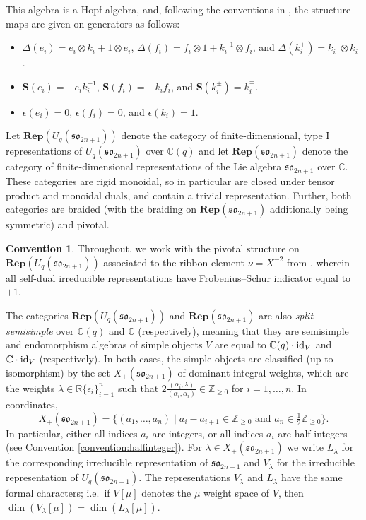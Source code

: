 \documentclass[10pt]{amsart}
\numberwithin{equation}{section}
\theoremstyle{definition}
\newtheorem{conv}[thm]{Convention}
\newcommand{\id}{{\rm id}}
\def\C{{\mathbb C}}
\def\R{{\mathbb R}}
\def\N{\mathbb{Z}_{\ge 0}}%
\newcommand{\son}[1][2n+1]{\mathfrak{so}_{#1}}
\newcommand{\Rep}{\mathbf{Rep}}
\begin{document}
This algebra is a Hopf algebra, and, 
following the conventions in \cite{CP,ST},
the structure maps are given on generators as follows:
\begin{itemize}
\item $\Delta(e_i) = e_i \otimes k_i + 1\otimes e_i$, 
	$\Delta(f_i) = f_i\otimes 1 + k_i^{-1}\otimes f_i$, 
	and $\Delta(k_i^{\pm}) = k_i ^{\pm}\otimes k_i^{\pm}$.
\item $\mathbf{S}(e_i) = -e_i k_i^{-1}$, 
	$\mathbf{S}(f_i) = - k_i f_i$, 
	and $\mathbf{S}(k_i^{\pm})= k_i^{\mp}$.
\item $\epsilon(e_i)= 0$, 
	$\epsilon(f_i) = 0$, 
	and $\epsilon(k_i) = 1$.
\end{itemize}

Let $\Rep(U_q(\son))$ denote the category of finite-dimensional, type I representations of $U_q(\son)$ over $\C(q)$
and let $\Rep(\son)$ denote the category of finite-dimensional representations of the Lie algebra $\son$ over $\C$. 
These categories are rigid monoidal, so in particular are closed under tensor product and 
monoidal duals, and contain a trivial representation. 
Further, both categories are braided (with the braiding on $\Rep(\son)$ additionally being symmetric) and pivotal.

\begin{conv}\label{conv:pivotal}
Throughout, we work with the pivotal structure on $\Rep(U_q(\son))$ 
associated to the ribbon element $\nu = X^{-2}$ from \cite{ST}, 
wherein all self-dual irreducible representations have Frobenius--Schur indicator equal to $+1$.
\end{conv}

The categories $\Rep(U_q(\son))$ and $\Rep(\son)$ are also 
\emph{split semisimple} over $\C(q)$ and $\C$ (respectively), 
meaning that they are semisimple and endomorphism algebras of simple objects $V$ 
are equal to $\C(q) \cdot \id_V$ and $\C \cdot \id_V$ (respectively).
In both cases, the simple objects are classified (up to isomorphism)
by the set $X_+(\son)$ of dominant integral weights, 
which are the weights $\lambda \in \R\{\epsilon_i\}_{i=1}^n$ 
such that $2\frac{(\alpha_i,\lambda)}{(\alpha_i, \alpha_i)}\in \N$ for $i=1, \dots, n$.
In coordinates,
\[
X_+(\son) = \{ (a_1,\ldots,a_n) \mid 
	a_i - a_{i+1} \in \N \text{ and } a_n \in \tfrac{1}{2} \N \}.
	\]
In particular, either all indices $a_i$ are integers, or all indices $a_i$ are half-integers (see Convention \ref{convention:halfinteger}).
For $\lambda \in X_+(\son)$ we write $L_{\lambda}$ for the corresponding irreducible representation of $\son$ 
and $V_{\lambda}$ for the irreducible representation of $U_q(\son)$. 
The representations $V_{\lambda}$ and $L_{\lambda}$ have the same formal characters; 
i.e.~if $V[\mu]$ denotes the $\mu$ weight space of $V$, then $\dim(V_{\lambda}[\mu]) = \dim(L_{\lambda}[\mu])$.
\end{document}
